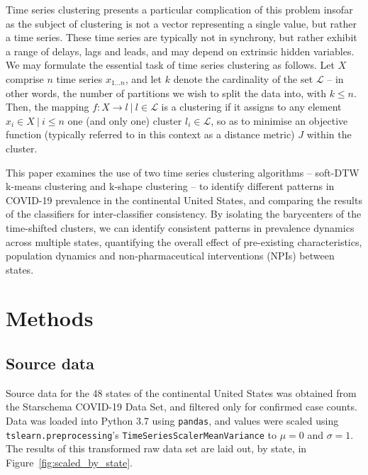 \documentclass{article}
\begin{document}
Time series clustering presents a particular complication of this problem insofar as the subject of clustering is not a vector representing a single value, but rather a time series. These time series are typically not in synchrony, but rather exhibit a range of delays, lags and leads, and may depend on extrinsic hidden variables. We may formulate the essential task of time series clustering as follows. Let $X$ comprise $n$ time series $x_{1 \ldots n}$, and let $k$ denote the cardinality of the set $\mathcal{L}$ -- in other words, the number of partitions we wish to split the data into, with $k \leq n$. Then, the mapping $f: X \rightarrow l \ | \ l \in \mathcal{L}$ is a clustering if it assigns to any element $x_i \in X \ | \ i \leq n$ one (and only one) cluster $l_i \in \mathcal{L}$, so as to minimise an objective function (typically referred to in this context as a distance metric) $J$ within the cluster.

This paper examines the use of two time series clustering algorithms -- soft-DTW k-means clustering and k-shape clustering -- to identify different patterns in COVID-19 prevalence in the continental United States, and comparing the results of the classifiers for inter-classifier consistency. By isolating the barycenters of the time-shifted clusters, we can identify consistent patterns in prevalence dynamics across multiple states, quantifying the overall effect of pre-existing characteristics, population dynamics and non-pharmaceutical interventions (NPIs) between states.


\section{Methods} %
\label{sec:methods}

\subsection{Source data} %
\label{sub:source_data}

Source data for the 48 states of the continental United States was obtained from the Starschema COVID-19 Data Set,\cite{foldi_tamas_2020_3969287} and filtered only for confirmed case counts. Data was loaded into Python 3.7 using \texttt{pandas},\cite{mckinney2011pandas} and values were scaled using \texttt{tslearn.preprocessing}'s \texttt{TimeSeriesScalerMeanVariance} to $\mu = 0$ and $\sigma = 1$. The results of this transformed raw data set are laid out, by state, in Figure~\ref{fig:scaled_by_state}. 
\end{document}
